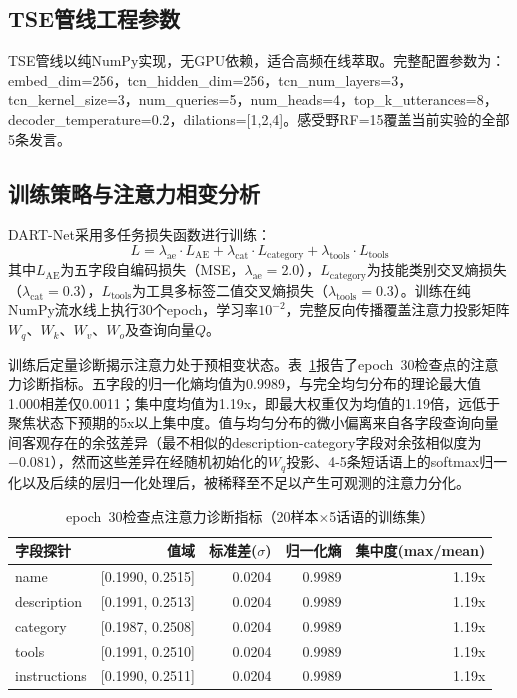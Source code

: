 \documentclass[12pt,a4paper]{ctexart}
\begin{document}
\subsection{TSE管线工程参数}

TSE管线以纯NumPy实现，无GPU依赖，适合高频在线萃取。完整配置参数为：embed\_dim=256，tcn\_hidden\_dim=256，tcn\_num\_layers=3，tcn\_kernel\_size=3，num\_queries=5，num\_heads=4，top\_k\_utterances=8，decoder\_temperature=0.2，dilations=[1,2,4]。感受野RF=15覆盖当前实验的全部5条发言。

\subsection{训练策略与注意力相变分析}

DART-Net采用多任务损失函数进行训练：
\begin{equation}
L = \lambda_{\text{ae}} \cdot L_{\text{AE}} + \lambda_{\text{cat}} \cdot L_{\text{category}} + \lambda_{\text{tools}} \cdot L_{\text{tools}}
\label{eq:loss}
\end{equation}
其中$L_{\text{AE}}$为五字段自编码损失（MSE，$\lambda_{\text{ae}}=2.0$），$L_{\text{category}}$为技能类别交叉熵损失（$\lambda_{\text{cat}}=0.3$），$L_{\text{tools}}$为工具多标签二值交叉熵损失（$\lambda_{\text{tools}}=0.3$）。训练在纯NumPy流水线上执行30个epoch，学习率$10^{-2}$，完整反向传播覆盖注意力投影矩阵$W_q$、$W_k$、$W_v$、$W_o$及查询向量$Q$。

训练后定量诊断揭示注意力处于预相变状态。表~\ref{tab:attention_diag}报告了epoch~30检查点的注意力诊断指标。五字段的归一化熵均值为0.9989，与完全均匀分布的理论最大值1.000相差仅0.0011；集中度均值为1.19x，即最大权重仅为均值的1.19倍，远低于聚焦状态下预期的5x以上集中度。值与均匀分布的微小偏离来自各字段查询向量间客观存在的余弦差异（最不相似的description-category字段对余弦相似度为$-0.081$），然而这些差异在经随机初始化的$W_q$投影、4-5条短话语上的softmax归一化以及后续的层归一化处理后，被稀释至不足以产生可观测的注意力分化。

\begin{table}[H]
\centering
\caption{epoch~30检查点注意力诊断指标（20样本$\times$5话语的训练集）}
\label{tab:attention_diag}
\begin{tabular}{lrrrr}
\toprule
字段探针 & 值域 & 标准差($\sigma$) & 归一化熵 & 集中度(max/mean) \\
\midrule
name        & [0.1990, 0.2515] & 0.0204 & 0.9989 & 1.19x \\
description & [0.1991, 0.2513] & 0.0204 & 0.9989 & 1.19x \\
category    & [0.1987, 0.2508] & 0.0204 & 0.9989 & 1.19x \\
tools       & [0.1991, 0.2510] & 0.0204 & 0.9989 & 1.19x \\
instructions & [0.1990, 0.2511] & 0.0204 & 0.9989 & 1.19x \\
\bottomrule
\end{tabular}
\end{table}
\end{document}
